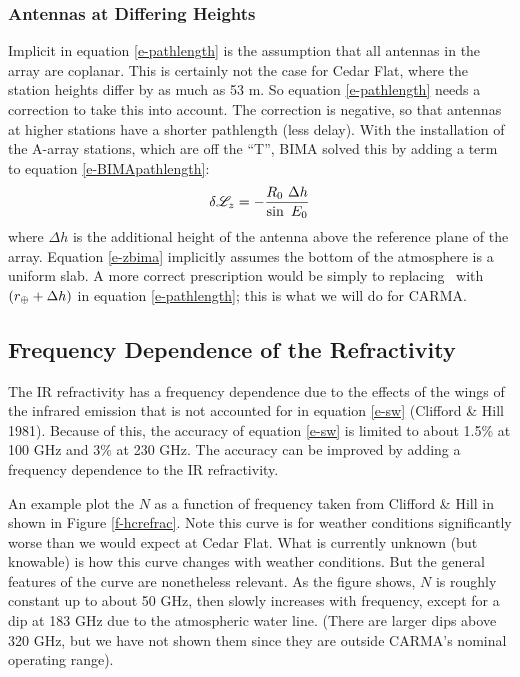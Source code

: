 \documentclass[preprint]{aastex}
\newcommand{\xlam}{
   \ifmmode{X_\lambda}
   \else{$X_\lambda$}
   \fi}
\newcommand{\zlam}{
   \ifmmode{Z_\lambda}
   \else{$Z_\lambda$}
   \fi}
\newcommand{\rearth}{  %
   \ifmmode{r_\oplus}
   \else{$r_\oplus$}
   \fi}
\newcommand{\scrL}{ %
   \ifmmode{{\mathscr L}}
   \else{${\mathscr L}$\/}
   \fi}
\def\esat{\ifmmode{\rm e_{sat}}\else{e$_{sat}$}\fi}
\begin{document}
\subsubsection{Antennas at Differing Heights\label{s-zheight}}
Implicit in equation \ref{e-pathlength} is the assumption that all antennas
in the array are coplanar.  This is certainly not the case for Cedar Flat,
where the station heights differ by as much as 53 m.  So equation 
\ref{e-pathlength} needs a correction to take this into account. 
The correction is negative, so that antennas at higher stations have
a shorter pathlength (less delay).
With the installation of the A-array stations, which are off the ``T'',
BIMA solved this by adding a term to equation 
\ref{e-BIMApathlength}:
\begin{equation}
\delta\scrL_z = -\frac{R_0~\Delta h}{\sin~E_0}
\label{e-zbima}
\end{equation}
\noindent where $\Delta h$ is the
additional height of the antenna above the reference plane of the array.
Equation \ref{e-zbima} implicitly assumes the bottom of the atmosphere
is a uniform slab.  A more correct prescription would be simply to
replacing \rearth\ with $(\rearth + \Delta h)$ in equation 
\ref{e-pathlength}; this is what we will do for CARMA.

\subsection{Frequency Dependence of the Refractivity}

The IR refractivity has a frequency dependence due to the effects of the
wings of the infrared emission that is not accounted for in equation
\ref{e-sw} (Clifford \& Hill 1981). Because of this, the accuracy of
equation \ref{e-sw} is limited to about 1.5\% at 100 GHz and 3\% at
230 GHz.  The accuracy can be improved by adding a frequency dependence
to the IR refractivity.

An example plot the $N$ as a function of frequency taken from Clifford
\& Hill in shown in Figure \ref{f-hcrefrac}.  Note this curve is for
weather conditions significantly worse than we would expect at Cedar Flat.
What is currently unknown (but knowable) is how this curve changes with
weather conditions.  But the general features of the curve are nonetheless
relevant.  As the figure shows, $N$ is roughly constant up to about 50 GHz,
then slowly increases with frequency, except for a dip at 183 GHz due to
the atmospheric water line. (There are larger dips above 320 GHz, but we
have not shown them since they are outside CARMA's nominal operating range).
\end{document}
